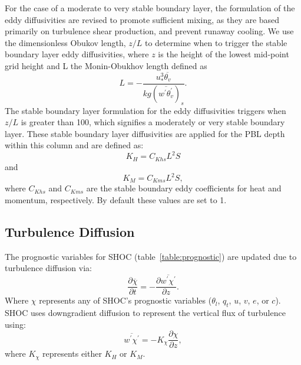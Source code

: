 For the case of a moderate to very stable boundary layer, the formulation of the eddy diffusivities are revised to promote sufficient mixing, as they are based primarily on turbulence shear production, and prevent runaway cooling.  We use the dimensionless Obukov length, $z/L$ to determine when to trigger the stable boundary layer eddy diffusivities, where $z$ is the height of the lowest mid-point grid height and L the Monin-Obukhov length defined as
%
\begin{equation}
  L=-\frac{u_{*}^{3}\overline{\theta_{v}}}{kg\left(\overline{w^{'}\theta^{'}_{v}}\right)_{s}}. 
  \label{monin}
\end{equation}
%
The stable boundary layer formulation for the eddy diffusivities triggers when $z/L$ is greater than 100, which signifies a moderately or very stable boundary layer.  These stable boundary layer diffusivities are applied for the PBL depth within this column and are defined as:
%
\begin{equation}
  K_{H}=C_{Khs} L^{2} S
  \label{stable_diffusivity_heat}
\end{equation}
%
and
%
\begin{equation}
  K_{M}=C_{Kms} L^{2} S , 
  \label{stable_diffusivity_momentum}
\end{equation}
%
where $C_{Khs}$ and $C_{Kms}$ are the stable boundary eddy coefficients for heat and momentum, respectively.  By default these values are set to 1. 
 
\subsection{Turbulence Diffusion}
\label{turb_diffusion}

The prognostic variables for SHOC (table~\ref{table:prognostic}) are updated due to turbulence diffusion via:
%
\begin{equation}
  \frac{\partial{\overline{\chi}}}{\partial{t}}= - \frac{\partial{\overline{w^{'}\chi^{'}}}}{\partial{z}} . 
  \label{turb_gov}
\end{equation}
%
Where $\chi$ represents any of SHOC's prognostic variables ($\theta_{l}$, $q_{t}$, $u$, $v$, $e$, or $c$).  SHOC uses downgradient diffusion to represent the vertical flux of turbulence using:
%
\begin{equation}
  \overline{w^{'}\chi^{'}} = -K_{\chi}\frac{\partial{\chi}}{\partial{z}}, 
  \label{vert_diffusion}
\end{equation}
%
where $K_{\chi}$ represents either $K_{H}$ or $K_{M}$.   

